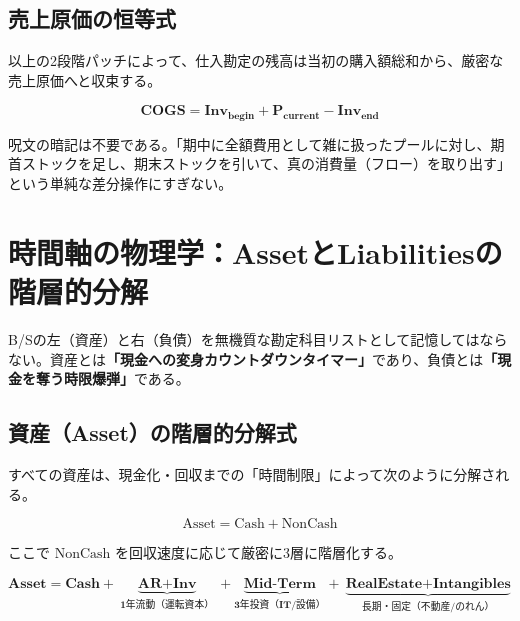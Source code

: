 \documentclass[11pt, a4paper]{report}
\begin{document}
\section{売上原価の恒等式}

以上の2段階パッチによって、仕入勘定の残高は当初の購入額総和から、厳密な売上原価へと収束する。

\begin{equation}
    \mathbf{\text{COGS} = \text{Inv}_{\text{begin}} + P_{\text{current}} - \text{Inv}_{\text{end}}}
\end{equation}

呪文の暗記は不要である。「期中に全額費用として雑に扱ったプールに対し、期首ストックを足し、期末ストックを引いて、真の消費量（フロー）を取り出す」という単純な差分操作にすぎない。

\chapter{時間軸の物理学：AssetとLiabilitiesの階層的分解}
\label{chap:time_horizon}

B/Sの左（資産）と右（負債）を無機質な勘定科目リストとして記憶してはならない。資産とは\textbf{「現金への変身カウントダウンタイマー」}であり、負債とは\textbf{「現金を奪う時限爆弾」}である。

\section{資産（Asset）の階層的分解式}

すべての資産は、現金化・回収までの「時間制限」によって次のように分解される。

\begin{equation}
    \text{Asset} = \text{Cash} + \text{NonCash}
\end{equation}

ここで $\text{NonCash}$ を回収速度に応じて厳密に3層に階層化する。

\begin{equation}
    \mathbf{\text{Asset} = \text{Cash} + \underbrace{\text{AR} + \text{Inv}}_{\text{1年流動（運転資本）}} + \underbrace{\text{Mid-Term}}_{\text{3年投資（IT/設備）}} + \underbrace{\text{RealEstate} + \text{Intangibles}}_{\text{長期・固定（不動産/のれん）}}}
\end{equation}
\end{document}
